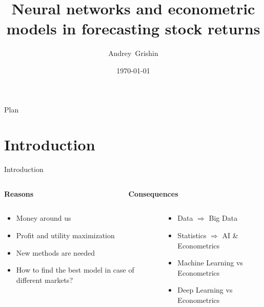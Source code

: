 \documentclass[11pt, aspectratio= 169]{beamer}
\title[Stock returns forecasting]{Neural networks and econometric models in forecasting stock returns}
\author{Andrey~Grishin}
\institute[Faculty of Economics MSU]{Faculty of Economics Moscow State University}
\date{\today}
\begin{document}
	\begin{frame}
		\maketitle
	\end{frame}
	
	\begin{frame}{Plan}
		\tableofcontents
	\end{frame}
	
	\section{Introduction}
	\begin{frame}{Introduction}
		\begin{columns}
			\begin{column}{0.5\textwidth}
				\centering
				\begin{LARGE}
					\textbf{Reasons}
				\end{LARGE}
			\end{column}
			\begin{column}{0.5\textwidth}
				\centering
				\begin{LARGE}
					\textbf{Consequences}
				\end{LARGE}
			\end{column}
		\end{columns}
		\vspace{0.3cm}
		\begin{columns}
			\begin{column}{0.5\textwidth}
				\large
				\begin{itemize}
					\item Money around us
					\item Profit and utility maximization
					\item New methods are needed
					\item How to find the best model in case of different markets?
				\end{itemize}
			\end{column}
			\hspace{0.5cm}
			\begin{column}{0.5\textwidth}
				\large
				\begin{itemize}
					\item Data $\Rightarrow$ Big Data
					\item Statistics $\Rightarrow$ AI \& Econometrics
					\item Machine Learning vs Econometrics
					\item Deep Learning vs Econometrics
				\end{itemize}
			\end{column}
		\end{columns}
	\end{frame}
	
\end{document}
